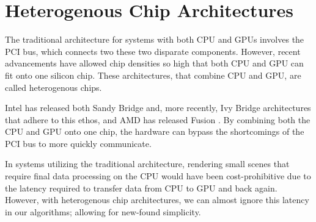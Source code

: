 \section{Heterogenous Chip Architectures}
\label{sec:heterogenous_chips}

The traditional architecture for systems with both CPU and GPUs involves the PCI bus, which connects two these two disparate components. However, recent advancements have allowed chip densities so high that both CPU and GPU can fit onto one silicon chip. These architectures, that combine CPU and GPU, are called heterogenous chips.

Intel has released both Sandy Bridge and, more recently, Ivy Bridge architectures \cite{bib:intel_press} that adhere to this ethos, and AMD has released Fusion \cite{bib:amd_press}. By combining both the CPU and GPU onto one chip, the hardware can bypass the shortcomings of the PCI bus to more quickly communicate.

In systems utilizing the traditional architecture, rendering small scenes that require final data processing on the CPU would have been cost-prohibitive due to the latency required to transfer data from CPU to GPU and back again. However, with heterogenous chip architectures, we can almost ignore this latency in our algorithms; allowing for new-found simplicity.

